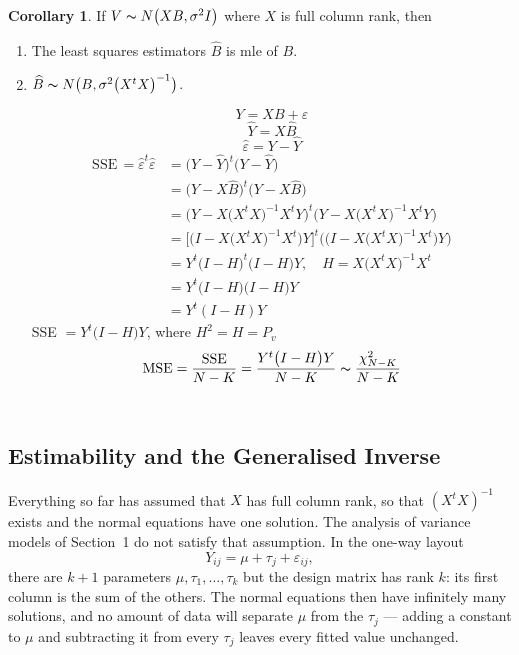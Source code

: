 \documentclass[11pt,a4paper]{article}
\theoremstyle{definition}
\newtheorem{coro}[thm]{Corollary}
\begin{document}
\begin{coro}\label{res:coro:2.3.4}
If $V\thicksim N\big(XB,\sigma^2I\big)$ where $X$ is full column rank, then
\begin{enumerate}
\item[i).] The least squares estimators $\widehat{B}$ is mle of $B$.
\item[ii).] $\widehat{B}\thicksim N\big(B,\sigma^2\big(X^tX\big)^{-1}\big)$.

$$Y=XB + \varepsilon$$
$$\widehat{Y}=X\widehat{B}$$
$$\widehat{\varepsilon} =Y-\widehat{Y}$$
\begin{align*}
\text{SSE}\, = \widehat{\varepsilon}^t\widehat{\varepsilon} & = \big(Y-\widehat{Y}\big)^t\big(Y-\widehat{Y}\big)\\
 & = \big(Y-X\widehat{B}\big)^t\big(Y-X\widehat{B}\big)\\
 & = \big(Y-X\big(X^tX\big)^{-1}X^tY\big)^t\big(Y-X\big(X^tX\big)^{-1}X^tY\big)\\
 & = \big[\big(I-X\big(X^tX\big)^{-1}X^t\big)Y\big]^t\big(\big(I-X\big(X^tX\big)^{-1}X^t\big)Y\big)\\
 & = Y^t\big(I-H\big)^t\big(I-H\big)Y,\quad  H=X\big(X^tX\big)^{-1}X^t\\
 & = Y^t\big(I-H\big)\big(I-H\big)Y\\
 & = Y^t(I-H)Y
\end{align*}
SSE $=Y^t\big(I-H\big)Y$, where $H^2=H=P_v$
$$\text{MSE}=\frac{\text{SSE}}{N-K}=\frac{Y^t\big(I-H\big)Y}{N-K}\thicksim \frac{\chi^2_{N-K}}{N-K}$$\\
\end{enumerate}
\end{coro}


\subsection{Estimability and the Generalised Inverse}

Everything so far has assumed that $X$ has full column rank, so that
$\left(X^tX\right)^{-1}$ exists and the normal equations have one solution.
The analysis of variance models of Section~1 do not satisfy that assumption.
In the one-way layout
$$Y_{ij}=\mu+\tau_j+\varepsilon_{ij},$$
there are $k+1$ parameters $\mu,\tau_1,\dots,\tau_k$ but the design matrix has
rank $k$: its first column is the sum of the others. The normal equations then
have infinitely many solutions, and no amount of data will separate $\mu$ from
the $\tau_j$ --- adding a constant to $\mu$ and subtracting it from every
$\tau_j$ leaves every fitted value unchanged.
\end{document}
